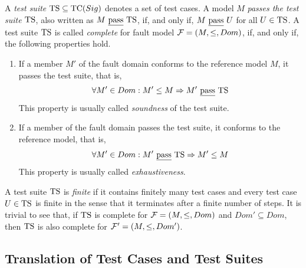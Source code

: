 A \emph{test suite} ${\text{TS}} \subseteq {\text{TC}}(Sig)$ denotes  a set of test cases. A
model $M$ \emph{passes the test suite} ${\text{TS}}$, also written as $M\ \underline{\text{pass}}\
{\text{TS}}$, if, and only if, $M\ \pass\ U$ for all $U\in {\text{TS}}$. A test suite ${\text{TS}}$
is called \emph{complete} for fault model ${\cal F} = (M,\le,Dom)$, if, and
only if, the following properties hold.
\begin{enumerate}
\item If a member $M'$ of the fault domain  conforms to the reference model $M$,
it passes the test suite, that is,
$$
\forall M'\in Dom: M'\le M \Rightarrow M'\ \underline{\text{pass}}\ {\text{TS}}
$$
This property is usually called \emph{soundness} of the test suite.

\item If a member of the fault domain passes the test suite, it conforms to the reference model, that is,
$$
\forall M'\in Dom: M'\ \underline{\text{pass}}\ {\text{TS}} \Rightarrow M'\le M
$$
This property is usually called \emph{exhaustiveness}.
\end{enumerate}
A test suite ${\text{TS}}$ is \emph{finite} if it contains finitely many test cases and every test
case $U\in{\text{TS}}$ is finite in the sense that it terminates after a finite number of steps.
It is trivial to see that, if ${\text{TS}}$ is complete  for   ${\cal F} = (M,\le,Dom)$
and $Dom'\subseteq Dom$, then ${\text{TS}}$ is also complete for ${\cal F}' = (M,\le,Dom')$.



\subsection{Translation of Test Cases and Test Suites}
\label{sec:transltt}

